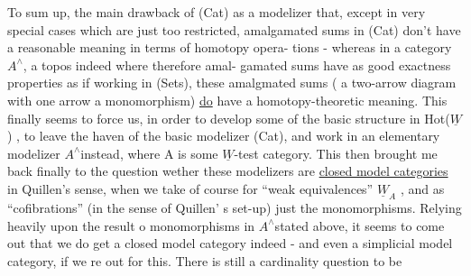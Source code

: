 To sum up,  the main drawback of (Cat) as a modelizer  that,  
except in very special cases which are just too restricted,  amalgamated
sums in (Cat) don't have a reasonable meaning in terms of homotopy opera-%
tions  -  whereas in a category $A^{\wedge}$,  a topos indeed where therefore amal-%
gamated sums have as good exactness properties as if working in (Sets),
these amalgmated sums ( a two-arrow diagram with one
arrow a monomorphism) \uline{do} have a homotopy-theoretic meaning.  This finally
seems to force us,  in order to develop some of the basic structure in
Hot($\underline{W}$) ,  to leave the haven of the basic modelizer (Cat),  and work in an
elementary modelizer $A^{\wedge}$\hand{/}instead,  where A is some $\underline{W}$-test category.  This
then brought me back finally to the question wether these modelizers are
\uline{closed model categories} in Quillen's sense,  when we take of course for
``weak equivalences''  $\underline{W}_A$ ,  and as ``cofibrations'' (in the sense of Quillen'
s set-up)  just the monomorphisms.  Relying heavily upon the result o
monomorphisms in $A^{\wedge}$\hand{/}stated above,  it seems to come out that we do get a
closed model category indeed  -  and even a simplicial model category,
if we re out for this.  There is still  a cardinality question to be

